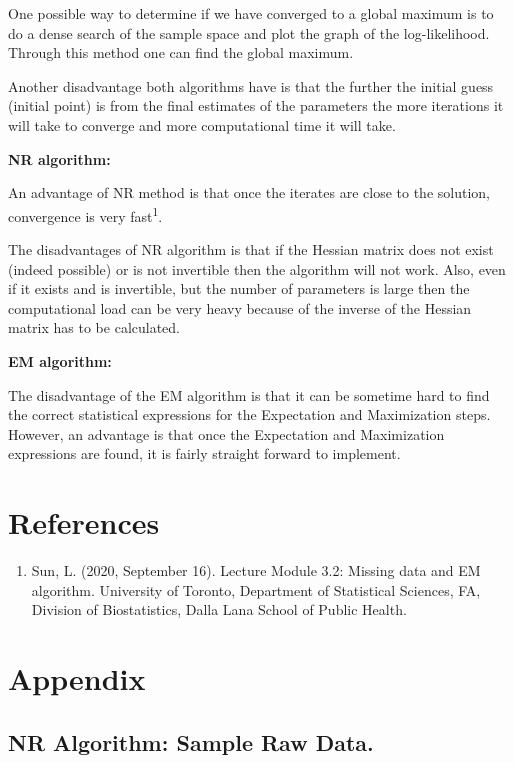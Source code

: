\documentclass[]{article}
\providecommand{\tightlist}{%
  \setlength{\itemsep}{0pt}\setlength{\parskip}{0pt}}
\begin{document}
One possible way to determine if we have converged to a global maximum
is to do a dense search of the sample space and plot the graph of the
log-likelihood. Through this method one can find the global maximum.

Another disadvantage both algorithms have is that the further the
initial guess (initial point) is from the final estimates of the
parameters the more iterations it will take to converge and more
computational time it will take.

\textbf{NR algorithm:}

An advantage of NR method is that once the iterates are close to the
solution, convergence is very fast\textsuperscript{1}.

The disadvantages of NR algorithm is that if the Hessian matrix does not
exist (indeed possible) or is not invertible then the algorithm will not
work. Also, even if it exists and is invertible, but the number of
parameters is large then the computational load can be very heavy
because of the inverse of the Hessian matrix has to be calculated.

\textbf{EM algorithm:}

The disadvantage of the EM algorithm is that it can be sometime hard to
find the correct statistical expressions for the Expectation and
Maximization steps. However, an advantage is that once the Expectation
and Maximization expressions are found, it is fairly straight forward to
implement.

\section{References}\label{references}

\begin{enumerate}
\def\labelenumi{\arabic{enumi}.}
\tightlist
\item
  Sun, L. (2020, September 16). Lecture Module 3.2: Missing data and EM
  algorithm. University of Toronto, Department of Statistical Sciences,
  FA, Division of Biostatistics, Dalla Lana School of Public Health.
\end{enumerate}

\section{Appendix}\label{appendix}

\subsection{NR Algorithm: Sample Raw
Data.}\label{nr-algorithm-sample-raw-data.}
\end{document}
